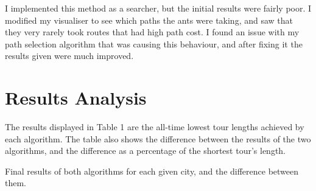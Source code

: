 \documentclass[a4paper,11pt]{article}
\begin{document}
I implemented this method as a searcher, but the initial results were fairly
poor. I modified my visualiser to see which paths the ants were taking, and saw
that they very rarely took routes that had high path cost. I found an issue
with my path selection algorithm that was causing this behaviour, and after
fixing it the results given were much improved.

\section{Results Analysis}
The results displayed in Table 1 are the all-time lowest tour lengths
achieved by each algorithm. The table also shows the difference between the
results of the two algorithms, and the difference as a percentage of the
shortest tour's length.

\begin{table}[l]

\caption{Final results of both algorithms for each given city, and the
	difference between them.}
\end{table}

\lipsum[1-5]
\end{document}
